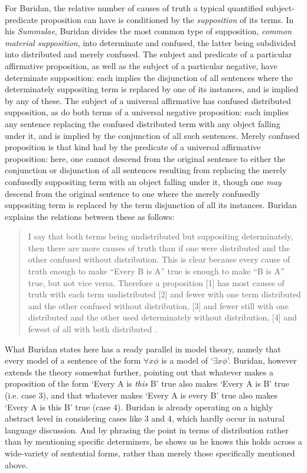 \documentclass[]{article}
\begin{document}
For Buridan, the relative number of causes of truth a typical quantified subject-predicate proposition can have is conditioned by the \textit{supposition} of its terms. In his \textit{Summulae}, Buridan divides the most common type of supposition, \textit{common material supposition}, into determinate and confused, the latter being subdivided into distributed and merely confused. The subject and predicate of a particular affirmative proposition, as well as the subject of a particular negative, have determinate supposition: each implies the disjunction of all sentences where the determinately suppositing term is replaced by one of its instances, and is implied by any of these. The subject of a universal affirmative has confused distributed supposition, as do both terms of a universal negative proposition: each implies any sentence replacing the confused distributed term with any object falling under it, and is implied by the conjunction of all such sentences. Merely confused proposition is that kind had by the predicate of a universal affirmative proposition: here, one cannot descend from the original sentence to either the conjunction or disjunction of all sentences resulting from replacing the merely confusedly suppositing term with an object falling under it, though one \textit{may} descend from the original sentence to one where the merely confusedly suppositing term is replaced by the term disjunction of all its instances. Buridan explains the relations between these as follows:

\begin{quote}
I say that both terms being undistributed but suppositing determinately, then there are more causes of truth than if one were distributed and the other confused without distribution. This is clear because every cause of truth enough to make ``Every B is A'' true is enough to make ``B is A'' true, but not vice versa. Therefore a proposition [1] has most causes of truth with each term undistributed [2] and fewer with one term distributed and the other confused without distribution, [3] and fewer still with one distributed and the other used determinately without distribution, [4] and fewest of all with both distributed \cite[TC I. 2, 66]{Buridan2015}.
\end{quote}

What Buridan states here has a ready parallel in model theory, namely that every model of a sentence of the form $\forall x \phi$ is a model of `$\exists x \phi$'. Buridan, however extends the theory somewhat further, pointing out that whatever makes a proposition of the form `Every A is \textit{this} B' true also makes `Every A is B' true (i.e. case 3), and that whatever makes `Every A is every B' true also makes `Every A is this B' true (case 4). Buridan is already operating on a highly abstract level in considering cases like 3 and 4, which hardly occur in natural language discussion. And by phrasing the point in terms of distribution rather than by mentioning specific determiners, he shows us he knows this holds across a wide-variety of sentential forms, rather than merely those specifically mentioned above.
\end{document}
